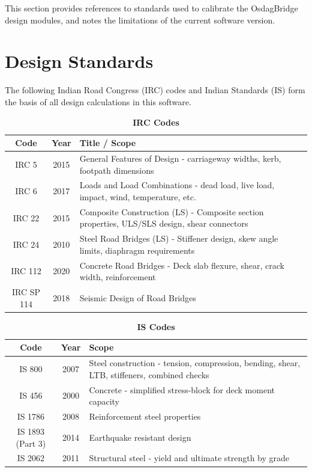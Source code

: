 \documentclass[12pt,a4paper]{report}
\numberwithin{table}{chapter}
\numberwithin{figure}{chapter}
\begin{document}
This section provides references to standards used to calibrate the OsdagBridge
design modules, and notes the limitations of the current software version.

\section{Design Standards}
\label{sec:design_standards}

The following Indian Road Congress (IRC) codes and Indian Standards (IS) 
form the basis of all design calculations in this software.

\vspace{0.5cm}

\begingroup
\setlength{\tabcolsep}{3.5pt}
\begin{table}[H]
\caption{\textbf{IRC Codes}}
\begin{tabular}{|c|c|p{13cm}|}
\hline
\textbf{Code} & \textbf{Year} & \textbf{Title / Scope} \\ 
\hline
IRC 5 & 2015 & General Features of Design - carriageway widths, kerb, footpath dimensions \\ 
\hline
IRC 6 & 2017 & Loads and Load Combinations - dead load, live load, impact, wind, temperature, etc. \\ 
\hline
IRC 22 & 2015 & Composite Construction (LS) - Composite section properties, ULS/SLS design, shear connectors \\ 
\hline
IRC 24 & 2010 & Steel Road Bridges (LS) - Stiffener design, skew angle limits, diaphragm requirements \\ 
\hline
IRC 112 & 2020 & Concrete Road Bridges - Deck slab flexure, shear, crack width, reinforcement \\ 
\hline
IRC SP 114 & 2018 & Seismic Design of Road Bridges \\ 
\hline
\end{tabular}
\end{table}

\begingroup
\setlength{\tabcolsep}{3.5pt}
\begin{table}[H]
\caption{\textbf{IS Codes}}
\begin{tabular}{|c|c|p{13cm}|}
\hline
\textbf{Code} & \textbf{Year} & \textbf{Scope} \\
\hline
IS 800 & 2007 & Steel construction - tension, compression, bending, shear, LTB, stiffeners, combined checks \\
\hline
IS 456 & 2000 & Concrete - simplified stress-block for deck moment capacity \\
\hline
IS 1786 & 2008 & Reinforcement steel properties \\
\hline
IS 1893 (Part 3) & 2014 & Earthquake resistant design \\
\hline
IS 2062 & 2011 & Structural steel - yield and ultimate strength by grade \\
\hline
\end{tabular}
\end{table}
\end{document}
